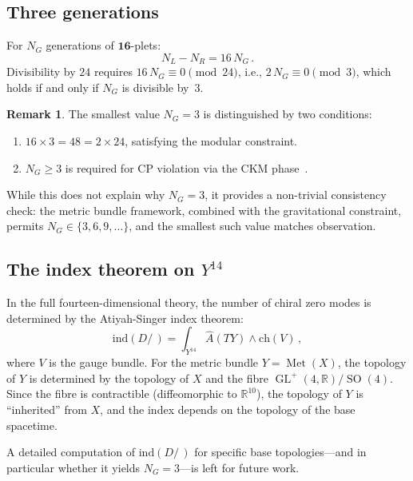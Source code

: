 \documentclass[12pt,a4paper]{article}
\theoremstyle{definition}
\newtheorem{remark}[theorem]{Remark}
\newcommand{\Met}{\operatorname{Met}}
\newcommand{\GL}{\operatorname{GL}}
\newcommand{\SO}{\operatorname{SO}}
\newcommand{\R}{\mathbb{R}}
\begin{document}
\subsection{Three generations}

For $N_G$ generations of $\mathbf{16}$-plets:
\begin{equation}
N_L - N_R = 16\, N_G\,.
\end{equation}
Divisibility by $24$ requires $16\, N_G \equiv 0 \pmod{24}$, i.e., $2\, N_G \equiv 0 \pmod{3}$, which holds if and only if $N_G$ is divisible by~$3$.

\begin{remark}
The smallest value $N_G = 3$ is distinguished by two conditions:
\begin{enumerate}[nosep]
\item $16 \times 3 = 48 = 2 \times 24$, satisfying the modular constraint.
\item $N_G \geq 3$ is required for CP violation via the CKM phase~\cite{KobayashiMaskawa1973}.
\end{enumerate}
While this does not explain why $N_G = 3$, it provides a non-trivial consistency check: the metric bundle framework, combined with the gravitational constraint, permits $N_G \in \{3, 6, 9, \ldots\}$, and the smallest such value matches observation.
\end{remark}

\subsection{The index theorem on $Y^{14}$}

In the full fourteen-dimensional theory, the number of chiral zero modes is determined by the Atiyah-Singer index theorem:
\begin{equation}
\mathrm{ind}(D\!\!\!\!/\,) = \int_{Y^{14}} \hat{A}(TY) \wedge \mathrm{ch}(V)\,,
\end{equation}
where $V$ is the gauge bundle.
For the metric bundle $Y = \Met(X)$, the topology of $Y$ is determined by the topology of $X$ and the fibre $\GL^+(4,\R)/\SO(4)$.
Since the fibre is contractible (diffeomorphic to $\R^{10}$), the topology of $Y$ is ``inherited'' from $X$, and the index depends on the topology of the base spacetime.

A detailed computation of $\mathrm{ind}(D\!\!\!\!/\,)$ for specific base topologies---and in particular whether it yields $N_G = 3$---is left for future work.


\end{document}
